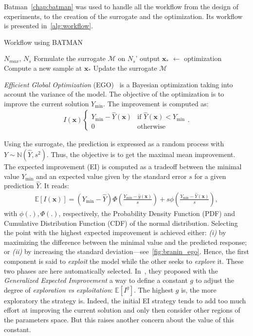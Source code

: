 Batman~\cref{chap:batman} was used to handle all the workflow from the design of experiments, to the creation of the surrogate and the optimization. Its workflow is presented in~\cref{alg:workflow}.

\begin{algorithm}
  \caption{Workflow using BATMAN}
  \label{alg:workflow}
  \begin{algorithmic}[1]
  \Require $N_{max}$, $N_s$
  \State Formulate the surrogate $\mathcal{M}$ on $N_s$' output
    \State $\mathbf{x_{*}}$ $\gets$ optimization
    \State Compute a new sample at $\mathbf{x_{*}}$
    \State Update the surrogate $\mathcal{M}$
  \EndWhile
  \end{algorithmic}
\end{algorithm}

\emph{Efficient Global Optimization} (EGO)~\cite{jones1998} is a Bayesian optimization taking into account the variance of the model. The objective of the optimization is to improve the current solution $Y_{\min}$. The improvement is computed as:
\begin{align}
I(\mathbf{x}) \left\{\begin{array}{rcl} Y_{\min} - \hat{Y}(\mathbf{x}) & \text{if } \hat{Y}(\mathbf{x}) < Y_{\min} \\ 0   & \text{otherwise} \end{array}\right. .
\end{align}

Using the surrogate, the prediction is expressed as a random process with $Y\sim \mathbb{N}(\hat{Y}, s^2)$. Thus, the objective is to get the maximal mean improvement. The expected improvement (EI) is computed as a tradeoff between the minimal value $Y_{\min}$ and an expected value given by the standard error $s$ for a given prediction $\hat{Y}$. It reads:
\begin{align}
\mathbb{E}[I(\mathbf{x})] = (Y_{\min} - \hat{Y})\Phi \left( \frac{Y_{\min} - \hat{y}(\mathbf{x})}{s} \right) + s\phi \left( \frac{Y_{\min} - \hat{Y}(\mathbf{x})}{s} \right), 
\end{align}
\noindent with $\phi(.), \Phi(.)$, respectively, the Probability Density Function (PDF) and Cumulative Distribution Function (CDF) of the normal distribution. Selecting the point with the highest expected improvement is achieved either: \emph{(i)} by maximizing the difference between the minimal value and the predicted response; or \emph{(ii)} by increasing the standard deviation---see~\cref{fig:branin_ego}. Hence, the first component is said to \emph{exploit} the model while the other seeks to \emph{explore} it. These two phases are here automatically selected. In~\cite{schonlau1998}, they proposed with the \emph{Generalized Expected Improvement} a way to define a constant $g$ to adjust the degree of \emph{exploration vs exploitation}: $\mathbb{E}[I^g]$. The highest $g$ is, the more exploratory the strategy is. Indeed, the initial EI strategy tends to add too much effort at improving the current solution and only then consider other regions of the parameters space. But this raises another concern about the value of this constant.

